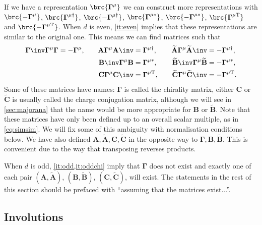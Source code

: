 \documentclass[11pt]{article}
\newcommand{\Gammab}{\boldsymbol{\Gamma}}
\newcommand{\mud}{{\mu\dag}}
\newcommand{\mut}{{\mu\mathrm{T}}}
\newcommand{\muc}{{\mu\ast}}
\newcommand{\A}{\mathbf{A}}
\newcommand{\B}{\mathbf{B}}
\renewcommand{\C}{\mathbf{C}}
\newcommand{\At}{\widetilde{\A}}
\newcommand{\Bt}{\widetilde{\B}}
\newcommand{\Ct}{\widetilde{\C}}
\begin{document}
If we have a representation $\brc{\Gammab^\mu}$ we can construct more representations with $\brc{-\Gammab^\mu}$, $\brc{\Gammab^\mud}$, $\brc{-\Gammab^\mud}$, $\brc{\Gammab^\muc}$, $\brc{-\Gammab^\muc}$, $\brc{\Gammab^\mut}$ and $\brc{-\Gammab^\mut}$.
When $d$ is even, \cref{it:even} implies that these representations are similar to the original one.
This means we can find matrices such that
%
\begin{equation}\label{eq:cccmats}
\begin{aligned}
  \Gammab\inv \Gammab^\mu \Gammab &= -\Gammab^\mu, &\quad
  \A  \Gammab^\mu \A\inv  &=  \Gammab^\mud, &\quad
  \At \Gammab^\mu \At\inv &= -\Gammab^\mud, \\ &&
  \B\inv  \Gammab^\mu \B  &=  \Gammab^\muc, &
  \Bt\inv \Gammab^\mu \Bt &= -\Gammab^\muc, \\ &&
  \C  \Gammab^\mu \C\inv  &=  \Gammab^\mut, &
  \Ct \Gammab^\mu \Ct\inv &= -\Gammab^\mut.
\end{aligned}
\end{equation}
%
Some of these matrices have names: $\Gammab$ is called the chirality matrix, either $\C$ or $\Ct$ is usually called the charge conjugation matrix, although we will see in \cref{sec:majorana} that the name would be more appropriate for $\B$ or $\Bt$.
Note that these matrices have only been defined up to an overall scalar multiple, as in \cref{eq:simsim}.
We will fix some of this ambiguity with normalisation conditions below.
We have also defined $\A,\At,\C,\Ct$ in the opposite way to $\Gammab,\B,\Bt$.
This is convenient due to the way that transposing reverses products.

When $d$ is odd, \cref{it:odd,it:oddchi} imply that $\Gammab$ does not exist and exactly one of each pair $(\A, \At)$, $(\B, \Bt)$, $(\C, \Ct)$, will exist.
The statements in the rest of this section should be prefaced with ``assuming that the matrices exist...''.


\subsection{Involutions}\label{sec:invol}
\end{document}
